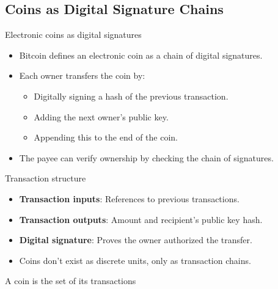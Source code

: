 \documentclass[aspectratio=169, lualatex, handout]{beamer}
\begin{document}
\subsection{Coins as Digital Signature Chains}

\begin{frame}{Electronic coins as digital signatures}
	\begin{itemize}
		\item Bitcoin defines an electronic coin as a chain of digital signatures.
		\item Each owner transfers the coin by:
		      \begin{itemize}
			      \item Digitally signing a hash of the previous transaction.
			      \item Adding the next owner's public key.
			      \item Appending this to the end of the coin.
		      \end{itemize}
		\item The payee can verify ownership by checking the chain of signatures.
	\end{itemize}
\end{frame}

\begin{frame}{Transaction structure}
	\begin{itemize}
		\item \textbf{Transaction inputs}: References to previous transactions.
		\item \textbf{Transaction outputs}: Amount and recipient's public key hash.
		\item \textbf{Digital signature}: Proves the owner authorized the transfer.
		\item Coins don't exist as discrete units, only as transaction chains.
	\end{itemize}
\end{frame}

\begin{frame}{A coin is the set of its transactions}
\end{frame}
\end{document}
